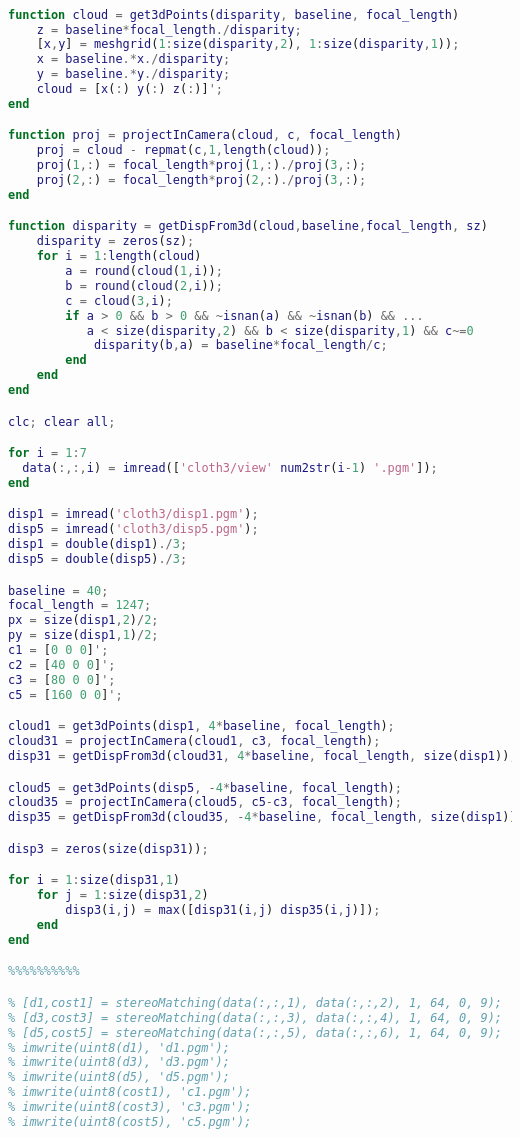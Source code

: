 \documentclass{article}
\begin{document}
\begin{lstlisting}[language=Matlab]

function cloud = get3dPoints(disparity, baseline, focal_length)
    z = baseline*focal_length./disparity;
    [x,y] = meshgrid(1:size(disparity,2), 1:size(disparity,1));
    x = baseline.*x./disparity;
    y = baseline.*y./disparity;
    cloud = [x(:) y(:) z(:)]';
end

function proj = projectInCamera(cloud, c, focal_length)
    proj = cloud - repmat(c,1,length(cloud));
    proj(1,:) = focal_length*proj(1,:)./proj(3,:);
    proj(2,:) = focal_length*proj(2,:)./proj(3,:);
end

function disparity = getDispFrom3d(cloud,baseline,focal_length, sz)
    disparity = zeros(sz);
    for i = 1:length(cloud)
        a = round(cloud(1,i));
        b = round(cloud(2,i));
        c = cloud(3,i);
        if a > 0 && b > 0 && ~isnan(a) && ~isnan(b) && ...
           a < size(disparity,2) && b < size(disparity,1) && c~=0
            disparity(b,a) = baseline*focal_length/c;
        end
    end
end

clc; clear all;

for i = 1:7
  data(:,:,i) = imread(['cloth3/view' num2str(i-1) '.pgm']); 
end

disp1 = imread('cloth3/disp1.pgm');
disp5 = imread('cloth3/disp5.pgm');
disp1 = double(disp1)./3;
disp5 = double(disp5)./3;

baseline = 40;
focal_length = 1247;
px = size(disp1,2)/2;
py = size(disp1,1)/2;
c1 = [0 0 0]';
c2 = [40 0 0]';
c3 = [80 0 0]';
c5 = [160 0 0]';

cloud1 = get3dPoints(disp1, 4*baseline, focal_length);
cloud31 = projectInCamera(cloud1, c3, focal_length);
disp31 = getDispFrom3d(cloud31, 4*baseline, focal_length, size(disp1));

cloud5 = get3dPoints(disp5, -4*baseline, focal_length);
cloud35 = projectInCamera(cloud5, c5-c3, focal_length);
disp35 = getDispFrom3d(cloud35, -4*baseline, focal_length, size(disp1));

disp3 = zeros(size(disp31));

for i = 1:size(disp31,1)
    for j = 1:size(disp31,2)
        disp3(i,j) = max([disp31(i,j) disp35(i,j)]);
    end
end

%%%%%%%%%%

% [d1,cost1] = stereoMatching(data(:,:,1), data(:,:,2), 1, 64, 0, 9);
% [d3,cost3] = stereoMatching(data(:,:,3), data(:,:,4), 1, 64, 0, 9);
% [d5,cost5] = stereoMatching(data(:,:,5), data(:,:,6), 1, 64, 0, 9);
% imwrite(uint8(d1), 'd1.pgm');
% imwrite(uint8(d3), 'd3.pgm');
% imwrite(uint8(d5), 'd5.pgm');
% imwrite(uint8(cost1), 'c1.pgm');
% imwrite(uint8(cost3), 'c3.pgm');
% imwrite(uint8(cost5), 'c5.pgm');


\end{lstlisting}
\end{document}
